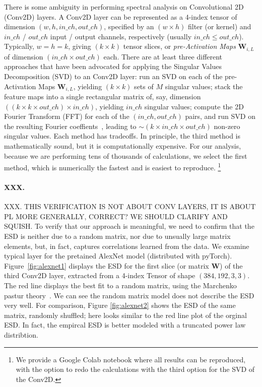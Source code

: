 There is some ambiguity in performing spectral analysis on Convolutional 2D (Conv2D) layers.  
A Conv2D layer can be represented as a 4-index tensor of dimension $(w,h,in\_ch,out\_ch)$, specified by an $(w\times h)$ filter (or kernel) and $in\_ch$ / $out\_ch$ input / output channels, respectively (usually $in\_ch\le out\_ch$). 
Typically, $w=h=k$,  giving $(k\times k)$ tensor slices, or \emph{pre-Activation Maps} $\mathbf{W}_{i,L}$ of dimension $(in\_ch\times out\_ch)$ each. 
%
There are at least three different approaches that have been advocated for applying the Singular Values Decomposition (SVD) to an Conv2D layer:
run an SVD on each of the pre-Activation Maps $\mathbf{W}_{i,L}$, yielding $(k\times k)$ sets of $M$ singular values; 
stack the feature maps into a single rectangular matrix of, say, dimension $((k\times k\times out\_ch)\times in\_ch)$, yielding $in\_ch$ singular values;
compute the 2D Fourier Transform (FFT) for each of the $(in\_ch, out\_ch)$ pairs, and run SVD on the resulting Fourier coeffients~\cite{Long2019}, leading to $\sim(k\times in\_ch\times out\_ch)$ non-zero singular values.
Each method has tradeoffs.  
In principle, the third method is mathematically sound, but it is computationally expensive. 
For our analysis, because we are performing tens of thousands of calculations, we select the first method, which is numerically the fastest and is easiest to reproduce.%
\footnote{We provide a Google Colab notebook where all results can be reproduced, with the option to redo the calculations with the third option for the SVD of the Conv2D.}


\paragraph{XXX.}
XXX.  THIS VERIFICATION IS NOT ABOUT CONV LAYERS, IT IS ABOUT PL MORE GENERALLY, CORRECT?  WE SHOULD CLARIFY AND SQUISH.
To verify that our approach is meaningful, we need to confirm that the ESD is neither due to a random matrix, nor due to unsually large matrix elements, but, in fact, captures correlations learned from the data. 
We examine typical layer for the pretained AlexNet model (distributed with pyTorch). 
Figure~\ref{fig:alexnet1} displays the ESD for the first slice (or matrix $\mathbf{W}$) of the third Conv2D layer, extracted from a 4-index Tensor of shape $(384, 192, 3, 3)$.  The red line displays the best fit to a random matrix, using the Marchenko pastur theory~\cite{MM}.  We can see the random matrix model does not describe the ESD very well. For comparison, Figure \ref{fig:alexnet2} shows the ESD of the same matrix, randomly shuffled; here looks similar to the red line plot of the orginal ESD.  In fact, the empircal ESD is better modeled with a truncated power law distribtion.

